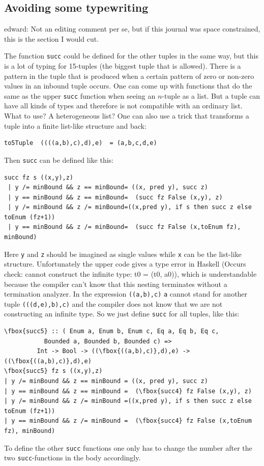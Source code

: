 \documentclass{tmr}
\newcommand{\authornote}[3]{{\color{#2} {\sc #1}: #3}}
\newcommand\bay[1]{\authornote{edward}{blue}{#1}}
\begin{document}
\subsection{Avoiding some typewriting}

\bay{Not an editing comment per se, but if this journal was space constrained, this is the section I would cut.}

The function \verb|succ| could be defined for the other tuples in the same way, but this is a lot of typing for 15-tuples (the biggest tuple that is allowed). 
There is a pattern in the tuple that is produced when a certain pattern of zero or non-zero values in an inbound tuple occurs.
One can come up with functions that do the same as the upper \verb|succ| function when seeing an $n$-tuple as a list.
But a tuple can have all kinds of types and therefore is not compatible with an ordinary list. What to use? A heterogeneous list? One can also use a trick that transforms a tuple into a finite list-like structure and back:

\begin{Verbatim}
to5Tuple  ((((a,b),c),d),e)  = (a,b,c,d,e)
\end{Verbatim}

Then \verb|succ| can be defined like this:
\begin{Verbatim}
succ fz s ((x,y),z)
 | y /= minBound && z == minBound= ((x, pred y), succ z)
 | y == minBound && z == minBound=  (succ fz False (x,y), z)
 | y /= minBound && z /= minBound=((x,pred y), if s then succ z else toEnum (fz+1))
 | y == minBound && z /= minBound=  (succ fz False (x,toEnum fz), minBound)
\end{Verbatim}
Here \verb|y| and \verb|z| should be imagined as single values while \verb|x| can be the list-like structure. 
Unfortunately the upper code gives a type error in Haskell (Occurs check: cannot construct the infinite type: t0 = (t0, a0)), which is understandable because the compiler can't know that this nesting terminates without a termination analyzer. In the expression \verb|((a,b),c)|  \verb|a| cannot stand for another tuple \eg \verb|(((d,e),b),c)| and the compiler does not know that we are not constructing an infinite type.
So we just define \verb|succ| for all tuples, like this:


\begin{Verbatim}[commandchars=\\\{\}]
\fbox{succ5} :: ( Enum a, Enum b, Enum c, Eq a, Eq b, Eq c,
           Bounded a, Bounded b, Bounded c) =>
         Int -> Bool -> ((\fbox{((a,b),c)},d),e) -> ((\fbox{((a,b),c)},d),e)
\fbox{succ5} fz s ((x,y),z)
| y /= minBound && z == minBound = ((x, pred y), succ z)
| y == minBound && z == minBound =  (\fbox{succ4} fz False (x,y), z)
| y /= minBound && z /= minBound =((x,pred y), if s then succ z else toEnum (fz+1))
| y == minBound && z /= minBound =  (\fbox{succ4} fz False (x,toEnum fz), minBound)
\end{Verbatim}
To define the other \verb|succ| functions one only has to change the number after the two \verb|succ|-functions in the body accordingly. 
\end{document}
